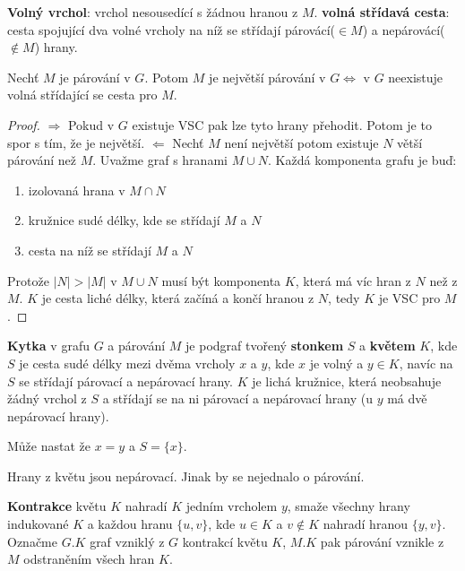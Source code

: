 \begin{definice}
	\textbf{Volný vrchol}: vrchol nesousedící s žádnou hranou z $M$. \textbf{volná střídavá cesta}: cesta spojující dva volné vrcholy na níž se střídají párovácí($\in M$) a nepárovácí($\notin M$) hrany.	
\end{definice}

\begin{lemma}
	Nechť $M$ je párování v $G$. Potom $M$ je největší párování v $G \Leftrightarrow$ v $G$ neexistuje volná střídající se cesta pro $M$.
\end{lemma}

\begin{proof}
	$\Rightarrow$ Pokud v $G$ existuje VSC pak lze tyto hrany přehodit. Potom je to spor s tím, že je největší. $\Leftarrow$ Nechť $M$ není největší potom existuje $N$ větší párování než $M$. Uvažme graf s hranami $M \cup N$. Každá komponenta grafu je buď:
	
	\begin{enumerate}
		\item izolovaná hrana v $M \cap N$
		\item kružnice sudé délky, kde se střídají $M$ a $N$
		\item cesta na níž se střídají $M$ a $N$
	\end{enumerate}
	
	Protože $|N| > |M|$ v $M \cup N$ musí být komponenta $K$, která má víc hran z $N$ než z $M$. $K$ je cesta liché délky, která začíná a končí hranou z $N$, tedy $K$ je VSC pro $M$.
\end{proof}

\begin{definice}
	\textbf{Kytka} v grafu $G$ a párování $M$ je podgraf tvořený \textbf{stonkem} $S$ a \textbf{květem} $K$, kde $S$ je cesta sudé délky mezi dvěma vrcholy $x$ a $y$, kde $x$ je volný a $y \in K$, navíc na $S$ se střídají párovací a nepárovací hrany. $K$ je lichá kružnice, která neobsahuje žádný vrchol z $S$ a střídají se na ni párovací a nepárovací hrany (u $y$ má dvě nepárovací hrany).
\end{definice}

Může nastat že $x=y$ a $S=\{x\}$.

\begin{pozor}
	Hrany z květu jsou nepárovací. Jinak by se nejednalo o párování.
\end{pozor}

\begin{definice}
	\textbf{Kontrakce} květu $K$ nahradí $K$ jedním vrcholem $y$, smaže všechny hrany indukované $K$ a každou hranu $\{u,v\}$, kde $u \in K$ a $v \notin K$ nahradí hranou $\{y,v\}$. Označme $G.K$ graf vzniklý z $G$ kontrakcí květu $K$, $M.K$ pak párování vznikle z $M$ odstraněním všech hran $K$.
\end{definice}

